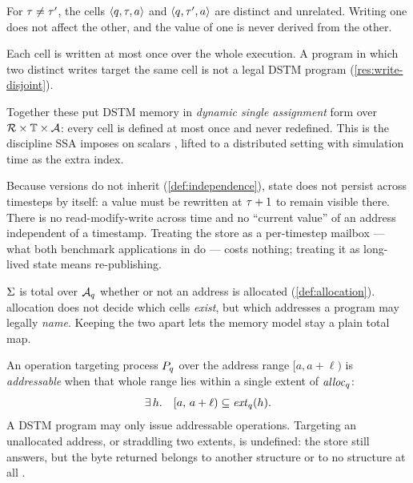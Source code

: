 \begin{definition}\label{def:independence}
For $\tau \ne \tau'$, the cells $\langle q, \tau, a\rangle$ and $\langle q, \tau', a\rangle$
are distinct and unrelated. Writing one does not affect the other, and the
value of one is never derived from the other. 
\end{definition}

\begin{definition}\label{def:single-assignment}
Each cell is written at most once over the whole execution. A program in which
two distinct writes target the same cell is not a legal DSTM program
(\cref{res:write-disjoint}).
\end{definition}

Together these put DSTM memory in \emph{dynamic single assignment} form
\cite{feautrier1991} over $\mathcal{R} \times \mathbb{T} \times \mathcal{A}$: every cell is
defined at most once and never redefined. This is the discipline SSA imposes
on scalars \cite{cytron1991ssa}, lifted to a distributed setting with
simulation time as the extra index.

\begin{remark}
\label{rem:republish}
Because \glspl{version} do not inherit (\cref{def:independence}), state does
not persist across timesteps by itself: a value must be rewritten at $\tau+1$
to remain visible there. There is no read-modify-write across time and no
``current value'' of an address independent of a timestamp. Treating the store
as a per-timestep mailbox --- what both benchmark applications in
\cite{dstm2026} do --- costs nothing; treating it as long-lived state means
re-publishing.
\end{remark}

\begin{remark}
\label{rem:alloc-orthogonal}
$\Sigma$ is total over $\mathcal{A}_{q}$ whether or not an address is allocated
(\cref{def:allocation}). \Gls{allocation} does not decide which \glspl{cell}
\emph{exist}, but which addresses a program may legally \emph{name}. Keeping
the two apart lets the memory model stay a plain total map.
\end{remark}

\begin{definition}[Addressability]\label{def:addressability}
An operation targeting process $P_{q}$ over the address range
$[a, a + \ell)$ is \emph{addressable} when that whole range lies within a
single extent of $\mathit{alloc}_{q}$:
\[
  \exists\, h .\quad [a,\, a + \ell) \subseteq \mathit{ext}_{q}(h) .
\]
A DSTM program may only issue addressable operations. Targeting an unallocated
address, or straddling two extents, is undefined: the store still answers, but
the byte returned belongs to another structure or to no structure at all
.
\end{definition}

